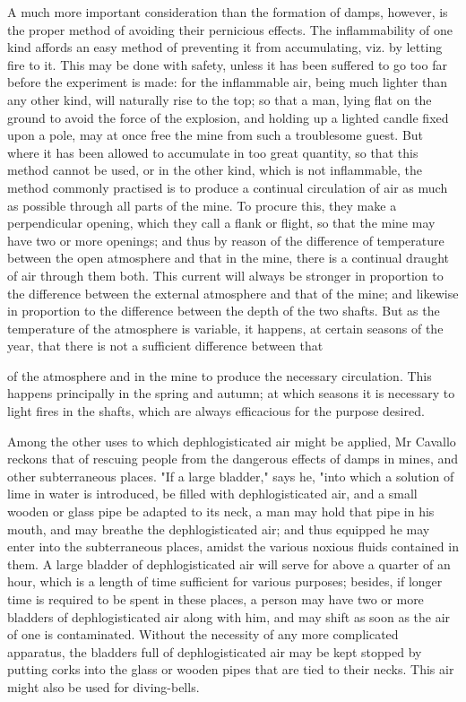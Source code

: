 \documentclass{article}
\begin{document}
A much more important consideration than the formation of damps, however, is the proper method of avoiding their pernicious effects. The inflammability of one kind affords an easy method of preventing it from accumulating, viz. by letting fire to it. This may be done with safety, unless it has been suffered to go too far before the experiment is made: for the inflammable air, being much lighter than any other kind, will naturally rise to the top; so that a man, lying flat on the ground to avoid the force of the explosion, and holding up a lighted candle fixed upon a pole, may at once free the mine from such a troublesome guest. But where it has been allowed to accumulate in too great quantity, so that this method cannot be used, or in the other kind, which is not inflammable, the method commonly practised is to produce a continual circulation of air as much as possible through all parts of the mine. To procure this, they make a perpendicular opening, which they call a flank or flight, so that the mine may have two or more openings; and thus by reason of the difference of temperature between the open atmosphere and that in the mine, there is a continual draught of air through them both. This current will always be stronger in proportion to the difference between the external atmosphere and that of the mine; and likewise in proportion to the difference between the depth of the two shafts. But as the temperature of the atmosphere is variable, it happens, at certain seasons of the year, that there is not a sufficient difference between that

of the atmosphere and in the mine to produce the necessary circulation. This happens principally in the spring and autumn; at which seasons it is necessary to light fires in the shafts, which are always efficacious for the purpose desired.

Among the other uses to which dephlogisticated air might be applied, Mr Cavallo reckons that of rescuing people from the dangerous effects of damps in mines, and other subterraneous places. "If a large bladder," says he, "into which a solution of lime in water is introduced, be filled with dephlogisticated air, and a small wooden or glass pipe be adapted to its neck, a man may hold that pipe in his mouth, and may breathe the dephlogisticated air; and thus equipped he may enter into the subterraneous places, amidst the various noxious fluids contained in them. A large bladder of dephlogisticated air will serve for above a quarter of an hour, which is a length of time sufficient for various purposes; besides, if longer time is required to be spent in these places, a person may have two or more bladders of dephlogisticated air along with him, and may shift as soon as the air of one is contaminated. Without the necessity of any more complicated apparatus, the bladders full of dephlogisticated air may be kept stopped by putting corks into the glass or wooden pipes that are tied to their necks. This air might also be used for diving-bells.
\end{document}
